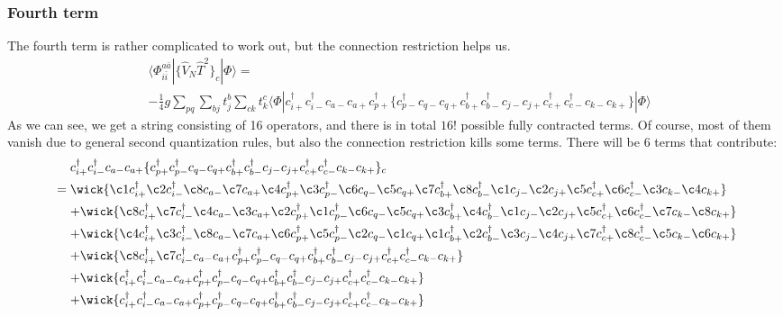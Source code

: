 \documentclass[norsk,a4paper,12pt]{article}
\begin{document}
\subsubsection*{Fourth term}
The fourth term is rather complicated to work out, but the connection restriction helps us.
\begin{align*}
&\langle\Phi_{i\bar{i}}^{a\bar{a}}|\{\hat{V}_N\hat{T}^2\}_c|\Phi\rangle=\\
&-\frac{1}{4}g\sum_{pq}\sum_{bj}t_j^b\sum_{ck}t_k^c\langle\Phi|c_{i+}^{\dagger}c_{i-}^{\dagger}c_{a-}c_{a+}c_{p+}^{\dagger}\{c_{p-}^{\dagger}c_{q-}c_{q+}c_{b+}^{\dagger}c_{b-}^{\dagger}c_{j-}c_{j+}c_{c+}^{\dagger}c_{c-}^{\dagger}c_{k-}c_{k+}\}|\Phi\rangle
\end{align*}
As we can see, we get a string consisting of 16 operators, and there is in total $16!$ possible fully contracted terms. Of course, most of them vanish due to general second quantization rules, but also the connection restriction kills some terms. There will be 6 terms that contribute:
\begin{align*}
&\mathrel{\phantom{=}}c_{i+}^{\dagger}c_{i-}^{\dagger}c_{a-}c_{a+}\{c_{p+}^{\dagger}c_{p-}^{\dagger}c_{q-}c_{q+}c_{b+}^{\dagger}c_{b-}^{\dagger}c_{j-}c_{j+}c_{c+}^{\dagger}c_{c-}^{\dagger}c_{k-}c_{k+}\}_c\\
&=\wick{\c1 c_{i+}^{\dagger}\c2 c_{i-}^{\dagger}\c8 c_{a-}\c7 c_{a+}\c4 c_{p+}^{\dagger}\c3 c_{p-}^{\dagger}\c6 c_{q-}\c5 c_{q+}\c7 c_{b+}^{\dagger}\c8 c_{b-}^{\dagger}\c1 c_{j-}\c2 c_{j+}\c5 c_{c+}^{\dagger}\c6 c_{c-}^{\dagger}\c3 c_{k-}\c4 c_{k+}}\\
&\mathrel{\phantom{=}}+\wick{\c8 c_{i+}^{\dagger}\c7 c_{i-}^{\dagger}\c4 c_{a-}\c3 c_{a+}\c2 c_{p+}^{\dagger}\c1 c_{p-}^{\dagger}\c6 c_{q-}\c5 c_{q+}\c3 c_{b+}^{\dagger}\c4 c_{b-}^{\dagger}\c1 c_{j-}\c2 c_{j+}\c5 c_{c+}^{\dagger}\c6 c_{c-}^{\dagger}\c7 c_{k-}\c8 c_{k+}}\\
&\mathrel{\phantom{=}}+\wick{\c4 c_{i+}^{\dagger}\c3 c_{i-}^{\dagger}\c8 c_{a-}\c7 c_{a+}\c6 c_{p+}^{\dagger}\c5 c_{p-}^{\dagger}\c2 c_{q-}\c1 c_{q+}\c1 c_{b+}^{\dagger}\c2 c_{b-}^{\dagger}\c3 c_{j-}\c4 c_{j+}\c7 c_{c+}^{\dagger}\c8 c_{c-}^{\dagger}\c5 c_{k-}\c6 c_{k+}}\\
&\mathrel{\phantom{=}}+\wick{\c8 c_{i+}^{\dagger}\c7 c_{i-}^{\dagger}c_{a-}c_{a+}c_{p+}^{\dagger}c_{p-}^{\dagger}c_{q-}c_{q+}c_{b+}^{\dagger}c_{b-}^{\dagger}c_{j-}c_{j+}c_{c+}^{\dagger}c_{c-}^{\dagger}c_{k-}c_{k+}}\\
&\mathrel{\phantom{=}}+\wick{c_{i+}^{\dagger}c_{i-}^{\dagger}c_{a-}c_{a+}c_{p+}^{\dagger}c_{p-}^{\dagger}c_{q-}c_{q+}c_{b+}^{\dagger}c_{b-}^{\dagger}c_{j-}c_{j+}c_{c+}^{\dagger}c_{c-}^{\dagger}c_{k-}c_{k+}}\\
&\mathrel{\phantom{=}}+\wick{c_{i+}^{\dagger}c_{i-}^{\dagger}c_{a-}c_{a+}c_{p+}^{\dagger}c_{p-}^{\dagger}c_{q-}c_{q+}c_{b+}^{\dagger}c_{b-}^{\dagger}c_{j-}c_{j+}c_{c+}^{\dagger}c_{c-}^{\dagger}c_{k-}c_{k+}}
\end{align*}
\end{document}
